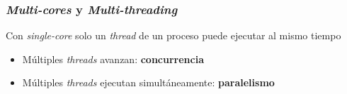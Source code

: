 \documentclass[letter]{beamer}
\begin{document}
\begin{frame}
  \frametitle{ {\em Multi-cores} y {\em Multi-threading}}

  Con {\em single-core} solo un {\em thread} de un proceso puede ejecutar al mismo tiempo

  
  
  \begin{itemize}
    \item<3-> Múltiples {\em threads} avanzan: {\bf concurrencia}
    \item<3-> Múltiples {\em threads} ejecutan simultáneamente: {\bf paralelismo}
  \end{itemize}
  
\end{frame}
\end{document}
